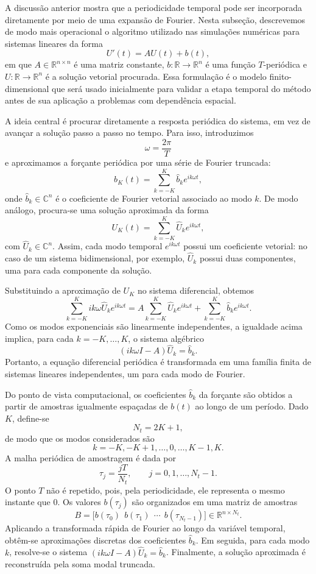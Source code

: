 A discussão anterior mostra que a periodicidade temporal pode ser incorporada diretamente por meio de uma expansão de Fourier. Nesta subseção, descrevemos de modo mais operacional o algoritmo utilizado nas simulações numéricas para sistemas lineares da forma
\[
U'(t)=AU(t)+b(t),
\]
em que \(A\in\mathbb{R}^{n\times n}\) é uma matriz constante, \(b:\mathbb{R}\to\mathbb{R}^n\) é uma função \(T\)-periódica e \(U:\mathbb{R}\to\mathbb{R}^n\) é a solução vetorial procurada. Essa formulação é o modelo finito-dimensional que será usado inicialmente para validar a etapa temporal do método antes de sua aplicação a problemas com dependência espacial.

A ideia central é procurar diretamente a resposta periódica do sistema, em vez de avançar a solução passo a passo no tempo. Para isso, introduzimos
\[
\omega=\frac{2\pi}{T}
\]
e aproximamos a forçante periódica por uma série de Fourier truncada:
\[
b_K(t)=\sum_{k=-K}^{K}\widehat{b}_k e^{ik\omega t},
\]
onde \(\widehat{b}_k\in\mathbb{C}^n\) é o coeficiente de Fourier vetorial associado ao modo \(k\). De modo análogo, procura-se uma solução aproximada da forma
\[
U_K(t)=\sum_{k=-K}^{K}\widehat{U}_k e^{ik\omega t},
\]
com \(\widehat{U}_k\in\mathbb{C}^n\). Assim, cada modo temporal \(e^{ik\omega t}\) possui um coeficiente vetorial: no caso de um sistema bidimensional, por exemplo, \(\widehat{U}_k\) possui duas componentes, uma para cada componente da solução.

Substituindo a aproximação de \(U_K\) no sistema diferencial, obtemos
\[
\sum_{k=-K}^{K}ik\omega\widehat{U}_k e^{ik\omega t}
=
A\sum_{k=-K}^{K}\widehat{U}_k e^{ik\omega t}
+
\sum_{k=-K}^{K}\widehat{b}_k e^{ik\omega t}.
\]
Como os modos exponenciais são linearmente independentes, a igualdade acima implica, para cada \(k=-K,\ldots,K\), o sistema algébrico
\[
(ik\omega I-A)\widehat{U}_k=\widehat{b}_k.
\]
Portanto, a equação diferencial periódica é transformada em uma família finita de sistemas lineares independentes, um para cada modo de Fourier.

Do ponto de vista computacional, os coeficientes \(\widehat{b}_k\) da forçante são obtidos a partir de amostras igualmente espaçadas de \(b(t)\) ao longo de um período. Dado \(K\), define-se
\[
N_t=2K+1,
\]
de modo que os modos considerados são
\[
k=-K,-K+1,\ldots,0,\ldots,K-1,K.
\]
A malha periódica de amostragem é dada por
\[
\tau_j=\frac{jT}{N_t},\qquad j=0,1,\ldots,N_t-1.
\]
O ponto \(T\) não é repetido, pois, pela periodicidade, ele representa o mesmo instante que \(0\). Os valores \(b(\tau_j)\) são organizados em uma matriz de amostras
\[
B=\bigl[b(\tau_0)\ \ b(\tau_1)\ \ \cdots\ \ b(\tau_{N_t-1})\bigr]\in\mathbb{R}^{n\times N_t}.
\]
Aplicando a transformada rápida de Fourier ao longo da variável temporal, obtêm-se aproximações discretas dos coeficientes \(\widehat{b}_k\). Em seguida, para cada modo \(k\), resolve-se o sistema \((ik\omega I-A)\widehat{U}_k=\widehat{b}_k\). Finalmente, a solução aproximada é reconstruída pela soma modal truncada.

